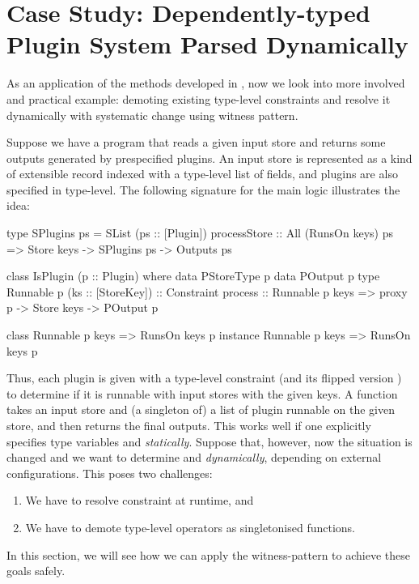 \documentclass[demotion-paper.tex]{subfiles}
\begin{document}
\section{Case Study: Dependently-typed Plugin System Parsed Dynamically}
\label{sec:plugins}

As an application of the methods developed in , now we look into more involved and practical example: demoting existing type-level constraints and resolve it dynamically with systematic change using witness pattern.

Suppose we have a program that reads a given input store and returns some outputs generated by prespecified plugins.
An input store is represented as a kind of extensible record indexed with a type-level list of fields, and plugins are also specified in type-level.
The following signature for the main logic illustrates the idea:
\begin{code}
type SPlugins ps = SList (ps :: [Plugin])
processStore :: All (RunsOn keys) ps
  => Store keys -> SPlugins ps -> Outputs ps

class IsPlugin (p :: Plugin) where
  data PStoreType p
  data POutput p
  type Runnable p (ks :: [StoreKey]) :: Constraint
  process :: Runnable p keys
    => proxy p -> Store keys -> POutput p

class Runnable p keys => RunsOn keys p
instance Runnable p keys => RunsOn keys p
\end{code}
Thus, each plugin  is given with a type-level constraint  (and its flipped version ) to determine if it is runnable with input stores with the given keys.
A function  takes an input store and (a singleton of) a list of plugin runnable on the given store, and then returns the final outputs.
This works well if one explicitly specifies type variables  and  \emph{statically}.
Suppose that, however, now the situation is changed and we want to determine  and  \emph{dynamically}, depending on external configurations.
This poses two challenges:
\begin{enumerate}
  \item We have to resolve constraint  at runtime, and
  \item We have to demote type-level operators as singletonised functions.
\end{enumerate}
In this section, we will see how we can apply the witness-pattern to achieve these goals safely.
\end{document}
